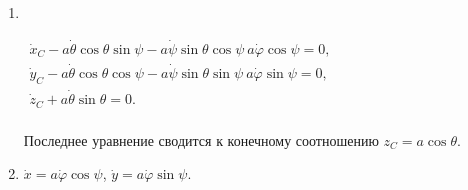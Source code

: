 \begin{enumerate}
\item ~

	\vspace{-1em}
	$\begin{array}{ll}
	\dot{x}_C - a\dot{\theta}\cos{\theta}\sin{\psi} -
	a\dot{\psi}\sin{\theta}\cos{\psi} \ a\dot{\varphi}\cos{\psi} = 0,\\
	\dot{y}_C - a\dot{\theta}\cos{\theta}\cos{\psi} -
	a\dot{\psi}\sin{\theta}\sin{\psi} \ a\dot{\varphi}\sin{\psi} = 0,\\
	\dot{z}_C + a\dot{\theta}\sin{\theta} = 0.\\
	\end{array}$

	Последнее уравнение сводится к конечному соотношению $z_C = a\cos{\theta}$.
\item $\dot{x} = a\dot{\varphi}\cos{\psi}$,
	$\dot{y} = a\dot{\varphi}\sin{\psi}$.
\end{enumerate}
